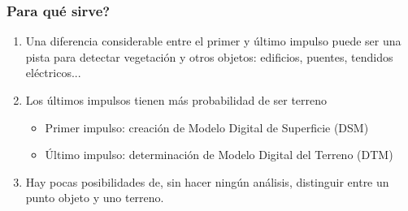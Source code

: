 \begin{frame}
    \frametitle{\textquestiondown Para qué sirve?}
    \begin{enumerate}[<+->]
     \item Una diferencia considerable entre el primer y último impulso puede ser una pista para detectar vegetación y otros objetos: edificios, puentes, tendidos eléctricos...
     \item Los últimos impulsos tienen más probabilidad de ser terreno
     	\begin{itemize}
     	   \item Primer impulso: creación de Modelo Digital de Superficie (\alert<4>{DSM})
     	   \item \'Ultimo impulso: determinación de Modelo Digital del Terreno (\alert<5>{DTM})
     	\end{itemize}
     \item Hay pocas posibilidades de, sin hacer ningún análisis, distinguir entre un punto \alert<6>{objeto} y uno \alert<6>{terreno}.
    \end{enumerate}
\end{frame}
